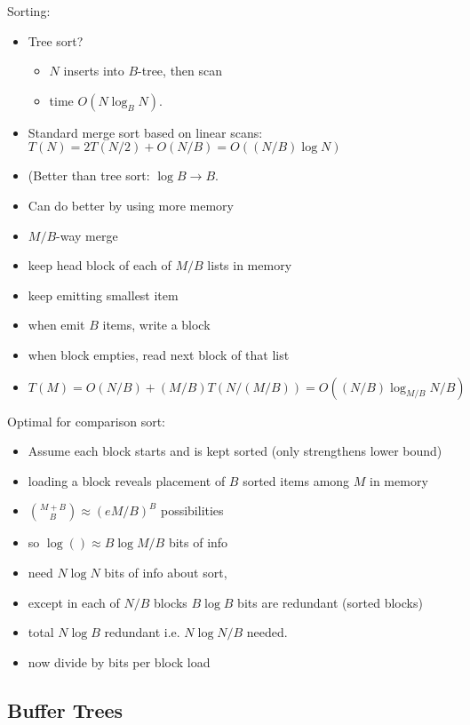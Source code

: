 \documentclass{article}
\begin{document}
Sorting:
\begin{itemize}
\item Tree sort?
\begin{itemize}
\item $N$ inserts into $B$-tree, then scan
\item time $O(N\log_B N)$.
\end{itemize}
\item Standard merge sort based on linear scans: $T(N)=2T(N/2) +
  O(N/B)=O((N/B)\log N)$
\item (Better than tree sort: $\log B \rightarrow B$.
\item Can do better by using more memory
\item $M/B$-way merge
\item keep head block of each of $M/B$ lists in memory
\item keep emitting smallest item
\item when emit $B$ items, write a block
\item when block empties, read next block of that list
\item $T(M) = O(N/B)+(M/B)T(N/(M/B)) = O((N/B)\log_{M/B}N/B)$
\end{itemize}

Optimal for comparison sort:
  \begin{itemize}
  \item Assume each block starts and is kept sorted (only
 strengthens lower bound)
  \item loading a block reveals placement of $B$ sorted items among
  $M$ in memory
  \item $\binom{M+B}{B} \approx (eM/B)^B$ possibilities
  \item so $\log() \approx B\log M/B$ bits of info
  \item need $N\log N$ bits of info about sort, 
  \item except in each of $N/B$ blocks $B\log B$ bits are redundant
  (sorted blocks)
  \item total $N\log B$ redundant i.e. $N\log N/B$ needed.
  \item now divide by bits per block load
  \end{itemize}

\subsection*{Buffer Trees}
\end{document}
